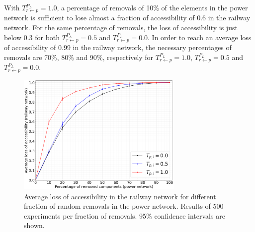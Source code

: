 \documentclass[review]{elsarticle}
\begin{document}
	With $T_{r \leftarrow p}^{P_L}=1.0$, a percentage of removals of 10\% of the elements in the power network is sufficient to lose almost a fraction of accessibility of 0.6 in the railway network. For the same percentage of removals, the loss of accessibility is just below 0.3 for both $T_{r \leftarrow p}^{P_L}=0.5$ and $T_{r \leftarrow p}^{P_L}=0.0$. In order to reach an average loss of accessibility of 0.99 in the railway network, the necessary percentages of removals are 70\%, 80\% and 90\%, respectively for $T_{r \leftarrow p}^{P_L}=1.0$, $T_{r \leftarrow p}^{P_L}=0.5$ and $T_{r \leftarrow p}^{P_L}=0.0$. 
		\begin{figure}[ht]
	\centering
	\includegraphics[width=8cm]{images/vuln_conn_power_to_rail.png}
	\caption{Average loss of accessibility in the railway network for different fraction of random removals in the power network. Results of 500 experiments per fraction of removals. 95\% confidence intervals are shown.}
	\label{vuln_power_to_rail}
\end{figure}
\end{document}
